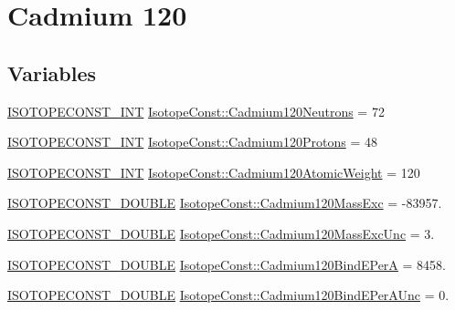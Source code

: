 \hypertarget{group___isotope_const-_cadmium-_cd120}{}\section{Cadmium 120}
\label{group___isotope_const-_cadmium-_cd120}
\subsection*{Variables}
\begin{DoxyCompactItemize}
\item 
\mbox{\hyperlink{group___isotope_const-_macros_ga5f18360b3e99483a35c32d789e62621c}{I\+S\+O\+T\+O\+P\+E\+C\+O\+N\+S\+T\+\_\+\+I\+NT}} \mbox{\hyperlink{group___isotope_const-_cadmium-_cd120_gaa99a719a21c8677b8f3e946ef26fdb15}{Isotope\+Const\+::\+Cadmium120\+Neutrons}} = 72
\item 
\mbox{\hyperlink{group___isotope_const-_macros_ga5f18360b3e99483a35c32d789e62621c}{I\+S\+O\+T\+O\+P\+E\+C\+O\+N\+S\+T\+\_\+\+I\+NT}} \mbox{\hyperlink{group___isotope_const-_cadmium-_cd120_gae27074ba1a464c67476b37de93a5c246}{Isotope\+Const\+::\+Cadmium120\+Protons}} = 48
\item 
\mbox{\hyperlink{group___isotope_const-_macros_ga5f18360b3e99483a35c32d789e62621c}{I\+S\+O\+T\+O\+P\+E\+C\+O\+N\+S\+T\+\_\+\+I\+NT}} \mbox{\hyperlink{group___isotope_const-_cadmium-_cd120_ga39ac0039d0ee08f0d20321018b355f8c}{Isotope\+Const\+::\+Cadmium120\+Atomic\+Weight}} = 120
\item 
\mbox{\hyperlink{group___isotope_const-_macros_ga8f45a7272ce02c0b4c65c44636ed719a}{I\+S\+O\+T\+O\+P\+E\+C\+O\+N\+S\+T\+\_\+\+D\+O\+U\+B\+LE}} \mbox{\hyperlink{group___isotope_const-_cadmium-_cd120_ga43d15511b2ff127c58b5c5dd9e73532e}{Isotope\+Const\+::\+Cadmium120\+Mass\+Exc}} = -\/83957.
\item 
\mbox{\hyperlink{group___isotope_const-_macros_ga8f45a7272ce02c0b4c65c44636ed719a}{I\+S\+O\+T\+O\+P\+E\+C\+O\+N\+S\+T\+\_\+\+D\+O\+U\+B\+LE}} \mbox{\hyperlink{group___isotope_const-_cadmium-_cd120_ga7341163e52a996076abb76786f78ba49}{Isotope\+Const\+::\+Cadmium120\+Mass\+Exc\+Unc}} = 3.
\item 
\mbox{\hyperlink{group___isotope_const-_macros_ga8f45a7272ce02c0b4c65c44636ed719a}{I\+S\+O\+T\+O\+P\+E\+C\+O\+N\+S\+T\+\_\+\+D\+O\+U\+B\+LE}} \mbox{\hyperlink{group___isotope_const-_cadmium-_cd120_gacdbd4513ef1103cf5031493969f76f54}{Isotope\+Const\+::\+Cadmium120\+Bind\+E\+PerA}} = 8458.
\item 
\mbox{\hyperlink{group___isotope_const-_macros_ga8f45a7272ce02c0b4c65c44636ed719a}{I\+S\+O\+T\+O\+P\+E\+C\+O\+N\+S\+T\+\_\+\+D\+O\+U\+B\+LE}} \mbox{\hyperlink{group___isotope_const-_cadmium-_cd120_gab1718316b7effd75d8c657c07efc4da9}{Isotope\+Const\+::\+Cadmium120\+Bind\+E\+Per\+A\+Unc}} = 0.

\end{DoxyCompactItemize}
